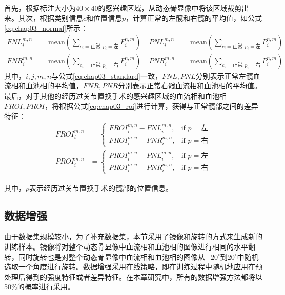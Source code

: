 首先，根据标注大小为\(40 \times 40\)的感兴趣区域，从动态骨显像中将该区域裁剪出来。其次，根据类别信息\(c\)和位置信息\(p\)，计算正常的左髋和右髋的平均值，如公式\ref{eq:chap03_normal}所示：
\begin{equation}
  \begin{aligned}
    FNL_{i}^{m, n} & = \text{mean}(\sum_{c_i = \text{正常}, p_i = \text{左} } F_i^{n, m}) & \quad PNL_{i}^{m, n} & = \text{mean}(\sum_{c_i = \text{正常}, p_i = \text{左} } P_i^{n, m}) \\
    FNR_{i}^{m, n} & = \text{mean}(\sum_{c_i = \text{正常}, p_i = \text{右} } F_i^{n, m}) & \quad PNR_{i}^{m, n} & = \text{mean}(\sum_{c_i = \text{正常}, p_i = \text{右} } P_i^{n, m})
  \end{aligned}
  \label{eq:chap03_normal}
\end{equation}
其中，\(i, j, m, n\)与公式\ref{eq:chap03_standard}一致，\(FNL, PNL\)分别表示正常左髋血流相和血池相的平均值，\(FNR, PNR\)分别表示正常右髋血流相和血池相的平均值。最后，对于其他的经历过关节置换手术的感兴趣区域的血流相和血池相\(FROI, PROI\)，将根据公式\ref{eq:chap03_roi}进行计算，获得与正常髋部之间的差异特征：
\begin{equation}
  \begin{aligned}
    FROI_i^{m, n} & =
    \begin{cases}
      FROI_i^{m, n} - FNL_i^{m, n}, & \text{if \(p = \)左} \\
      FROI_i^{m, n} - FNR_i^{m, n}, & \text{if \(p = \)右}
    \end{cases} \\
    PROI_i^{m, n} & =
    \begin{cases}
      PROI_i^{m, n} - PNL_i^{m, n}, & \text{if \(p = \)左} \\
      PROI_i^{m, n} - PNR_i^{m, n}, & \text{if \(p = \)右}
    \end{cases}
  \end{aligned}
  \label{eq:chap03_roi}
\end{equation}

其中，\(p\)表示经历过关节置换手术的髋部的位置信息。

\subsection{数据增强}

由于数据集规模较小，为了补充数据集，本节采用了镜像和旋转的方式来生成新的训练样本。镜像将对整个动态骨显像中血流相和血池相的图像进行相同的水平翻转，同时旋转也是对整个动态骨显像中血流相和血池相的图像从\(-20^{\circ}\)到\(20^{\circ}\)中随机选取一个角度进行旋转。数据增强采用在线策略，即在训练过程中随机地应用在预处理后得到的强度特征或者差异特征。在本章研究中，所有的数据增强方法都将以50\%的概率进行采用。

